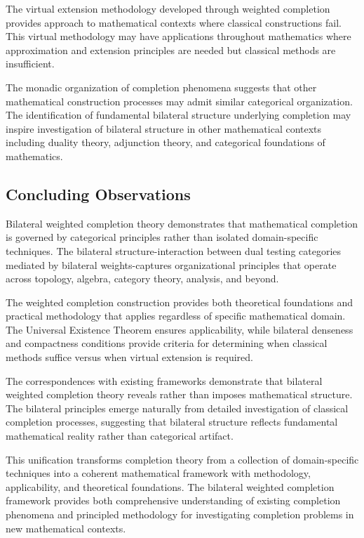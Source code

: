 \documentclass[11pt]{article}
\theoremstyle{plain}
\theoremstyle{definition}
\theoremstyle{remark}
\begin{document}
The virtual extension methodology developed through weighted completion provides approach to mathematical contexts where classical constructions fail. This virtual methodology may have applications throughout mathematics where approximation and extension principles are needed but classical methods are insufficient.

The monadic organization of completion phenomena suggests that other mathematical construction processes may admit similar categorical organization. The identification of fundamental bilateral structure underlying completion may inspire investigation of bilateral structure in other mathematical contexts including duality theory, adjunction theory, and categorical foundations of mathematics.

\subsection{Concluding Observations}

Bilateral weighted completion theory demonstrates that mathematical completion is governed by categorical principles rather than isolated domain-specific techniques. The bilateral structure-interaction between dual testing categories mediated by bilateral weights-captures organizational principles that operate across topology, algebra, category theory, analysis, and beyond.

The weighted completion construction provides both theoretical foundations and practical methodology that applies regardless of specific mathematical domain. The Universal Existence Theorem ensures applicability, while bilateral denseness and compactness conditions provide criteria for determining when classical methods suffice versus when virtual extension is required.

The correspondences with existing frameworks demonstrate that bilateral weighted completion theory reveals rather than imposes mathematical structure. The bilateral principles emerge naturally from detailed investigation of classical completion processes, suggesting that bilateral structure reflects fundamental mathematical reality rather than categorical artifact.

This unification transforms completion theory from a collection of domain-specific techniques into a coherent mathematical framework with methodology, applicability, and theoretical foundations. The bilateral weighted completion framework provides both comprehensive understanding of existing completion phenomena and principled methodology for investigating completion problems in new mathematical contexts.
\end{document}

